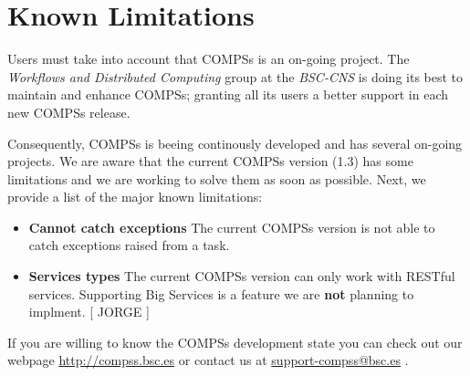\section{Known Limitations}
\label{sec:Known_Limitations}

Users must take into account that COMPSs is an on-going project. The \textit{Workflows and Distributed Computing} group 
at the \textit{BSC-CNS} is doing its best to maintain and enhance COMPSs; granting all its users a better support in
each new COMPSs release. 

Consequently, COMPSs is beeing continously developed and has several on-going projects. We are aware that the current COMPSs version
(1.3) has some limitations and we are working to solve them as soon as possible. Next, we provide a list of the major known
limitations: 
\begin{itemize}
 \item \textbf{Cannot catch exceptions} The current COMPSs version is not able to catch exceptions raised from a task.
 \item \textbf{Services types} The current COMPSs version can only work with RESTful services. Supporting Big Services is a 
 feature we are \textbf{not} planning to implment. [ JORGE ]
\end{itemize}

If you are willing to know the COMPSs development state you can check out our webpage \url{http://compss.bsc.es} or 
contact us at \url{support-compss@bsc.es} .